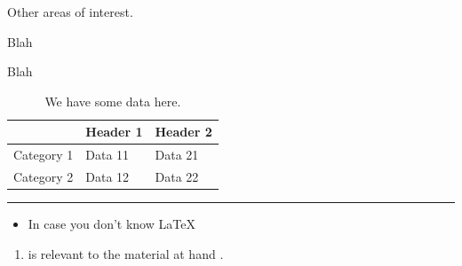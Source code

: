 Other areas of interest.

Blah

Blah

\begin{table}[h]
    \centering
    \begin{tabular}{l|l|l}
    ~          & Header 1 & Header 2 \\ \hline \hline
    Category 1 & Data 11  & Data 21  \\ \hline
    Category 2 & Data 12  & Data 22  \\
    \end{tabular}
    \rule{35em}{0.5pt}
    \caption[Short title here.]{We have some data here.}
\end{table}

\begin{itemize}
\item In case you don't know \LaTeX{}
\end{itemize}

\begin{enumerate}
\item \citet{Tanelli2008} is relevant to the material at hand \cite{Tanelli2008}.
\end{enumerate}
